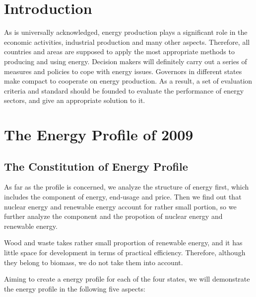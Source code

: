 
\section{Introduction}







As is universally acknowledged, energy production plays a significant role in the economic activities, industrial production and many other aspects. Therefore, all countries and areas are supposed to apply the most appropriate methods to producing and using energy. Decision makers will definitely carry out a series of measures and policies to cope with energy issues. Governors in different states make compact to cooperate on energy production. As a result, a set of evaluation criteria and standard should be founded to evaluate the performance of energy sectors, and give an appropriate solution to it.



















\section{The Energy Profile of 2009}
\subsection{The Constitution of Energy Profile }
As far as the profile is concerned, we analyze the structure of energy first, which includes the component of energy, end-usage and price. Then we find out that nuclear energy and renewable energy account for rather small portion, so we further analyze the component and the propotion of nuclear energy and renewable energy.


Wood and waste takes rather small proportion of renewable energy, and it has little space for development in terms of practical efficiency. Therefore, although they belong to biomass, we do not take them into account.


Aiming to create a energy profile for each of the four states, we  will demonstrate the energy profile in the following five aspects:

